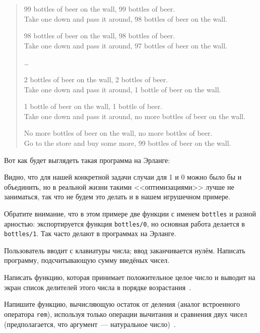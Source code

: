 \documentclass[
  paper=a4,
  fontsize=14pt,
  openany,
  appendixprefix=true
]{scrbook}
\begin{document}
\label{bottles}
\begin{verse}
\small 99 bottles of beer on the wall, 99 bottles of beer.\\
Take one down and pass it around, 98 bottles of beer on the wall.

98 bottles of beer on the wall, 98 bottles of beer.\\
Take one down and pass it around, 97 bottles of beer on the wall.

\ldots

2 bottles of beer on the wall, 2 bottles of beer.\\
Take one down and pass it around, 1 bottle of beer on the wall.

1 bottle of beer on the wall, 1 bottle of beer.\\
Take one down and pass it around, no more bottles of beer on the wall.

No more bottles of beer on the wall, no more bottles of beer.\\
Go to the store and buy some more, 99 bottles of beer on the wall.
\end{verse}

Вот как будет выглядеть такая программа на Эрланге:



Видно, что для нашей конкретной задачи случаи для 1 и 0 можно было бы и объединить, но в реальной жизни такими <<оптимизациями>> лучше не заниматься, так что не будем это делать и в нашем игрушечном примере.

Обратите внимание, что в этом примере две функции с именем \lstinline{bottles} и разной арностью: экспортируется функция \lstinline{bottles/0}, но основная работа делается в \lstinline{bottles/1}. Так часто делают в программах на Эрланге.

\begin{problem}\label{summ}
Пользователь вводит с клавиатуры числа; ввод заканчивается нулём. Написать программу, подсчитывающую сумму введёных чисел.
\end{problem}

\begin{problem}\label{divisors}
Написать функцию, которая принимает положительное целое число и выводит на экран список делителей этого числа в порядке возрастания~\cite[10.4]{zlatopolsky}.
\end{problem}

\begin{problem}\label{remainder}
Напишите функцию, вычисляющую остаток от деления (аналог встроенного оператора \lstinline{rem}), используя только операции вычитания и сравнения двух чисел (предполагается, что аргумент~--- натуральное число)~\cite{miller}.
\end{problem}
\end{document}
